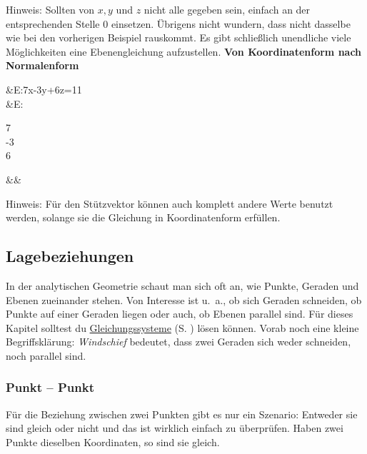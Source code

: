 \documentclass[12pt]{article}
\newcommand{\highlight}[2]{\textcolor{blue}{\hyperref[#1]{#2}} (S. \pageref{#1})}
\begin{document}
		Hinweis: Sollten von $x,y$ und $z$ nicht alle gegeben sein, einfach an der entsprechenden Stelle $0$ einsetzen. Übrigens nicht wundern, dass nicht dasselbe wie bei den vorherigen Beispiel rauskommt. Es gibt schließlich unendliche viele Möglichkeiten eine Ebenengleichung aufzustellen.\newline\newline\newline
		\textbf{Von Koordinatenform nach Normalenform}
		\begin{flalign*}
		&E:7x-3y+6z=11\\
		\Rightarrow&E:\begin{pmatrix}7\\-3\\6\end{pmatrix}\cdot\left[\begin{pmatrix}x\\y\\z\end{pmatrix}-\begin{pmatrix}2\\3\\1\end{pmatrix}\right]&&
		\end{flalign*}
		Hinweis: Für den Stützvektor können auch komplett andere Werte benutzt werden, solange sie die Gleichung in Koordinatenform erfüllen.
	\subsection{Lagebeziehungen}
		In der analytischen Geometrie schaut man sich oft an, wie Punkte, Geraden und Ebenen zueinander stehen. Von Interesse ist u.~a., ob sich Geraden schneiden, ob Punkte auf einer Geraden liegen oder auch, ob Ebenen parallel sind. Für dieses Kapitel solltest du \highlight{sec:gleichungssysteme}{Gleichungssysteme} lösen können. Vorab noch eine kleine Begriffsklärung: \textit{Windschief} bedeutet, dass zwei Geraden sich weder schneiden, noch parallel sind.
		\subsubsection{Punkt – Punkt}
			Für die Beziehung zwischen zwei Punkten gibt es nur ein Szenario: Entweder sie sind gleich oder nicht und das ist wirklich einfach zu überprüfen. Haben zwei Punkte dieselben Koordinaten, so sind sie gleich.
\end{document}
